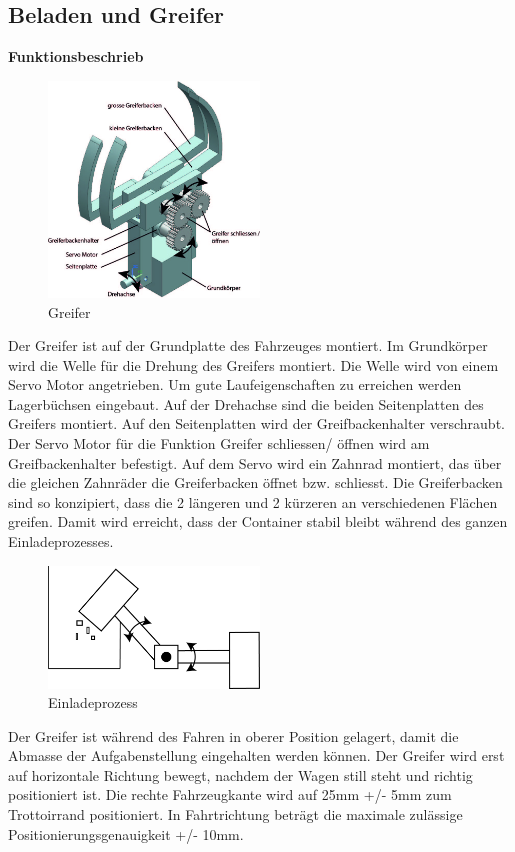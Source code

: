 \subsection{Beladen und Greifer}

\textbf{Funktionsbeschrieb}
\begin{figure}[H]
\centering
\includegraphics[width=0.5\textwidth]{03_Loesungskonzept/pictures/greifer3.jpg}
\caption{Greifer}
\end{figure}\flushleft

Der Greifer ist auf der Grundplatte des Fahrzeuges montiert. Im Grundkörper wird die Welle für die Drehung des Greifers montiert. Die Welle wird von einem Servo Motor angetrieben. Um gute Laufeigenschaften zu erreichen werden Lagerbüchsen eingebaut. Auf der Drehachse sind die beiden Seitenplatten des Greifers montiert. Auf den Seitenplatten wird der Greifbackenhalter verschraubt.  Der Servo Motor für die Funktion Greifer schliessen/ öffnen wird am Greifbackenhalter befestigt. Auf dem Servo wird ein Zahnrad montiert, das über die gleichen Zahnräder die Greiferbacken öffnet bzw. schliesst. Die Greiferbacken sind so konzipiert, dass die 2 längeren und 2 kürzeren an verschiedenen Flächen greifen. Damit wird erreicht, dass der Container stabil bleibt während des ganzen Einladeprozesses. 

\begin{figure}[H]
\centering
\includegraphics[width=0.5\textwidth]{03_Loesungskonzept/pictures/Beladen_1.png}
\caption{Einladeprozess}
\end{figure}\flushleft
Der Greifer ist während des Fahren in oberer Position gelagert, damit die Abmasse der Aufgabenstellung eingehalten werden können. Der Greifer wird erst auf horizontale Richtung bewegt, nachdem der Wagen still steht und richtig positioniert ist.
Die rechte Fahrzeugkante wird auf 25mm +/- 5mm zum Trottoirrand positioniert. In Fahrtrichtung beträgt die maximale zulässige Positionierungsgenauigkeit +/- 10mm.

